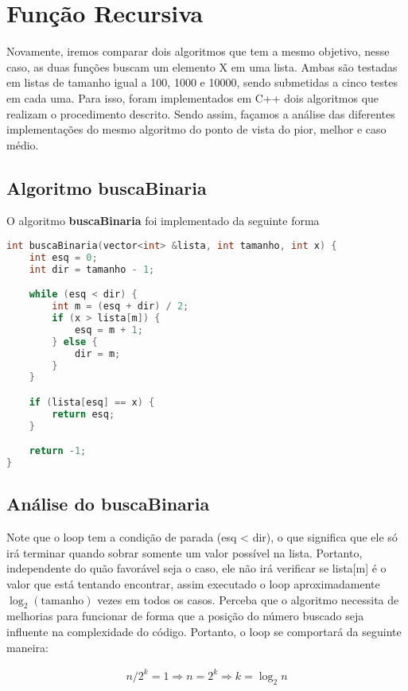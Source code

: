 \section{Função Recursiva}
\label{sec:func-rec}

Novamente, iremos comparar dois algoritmos que tem a mesmo objetivo, nesse caso, as duas funções buscam um elemento X em uma lista. Ambas são testadas em listas de tamanho igual a 100, 1000 e 10000, sendo submetidas a cinco testes em cada uma. Para isso, foram implementados em C++ dois algoritmos que realizam o procedimento descrito. Sendo assim, façamos a análise das diferentes implementações do mesmo algoritmo do ponto de vista do pior, melhor e caso médio.

\subsection{Algoritmo buscaBinaria}

O algoritmo \textbf{buscaBinaria} foi implementado da seguinte forma

\begin{lstlisting}[language=C++]
int buscaBinaria(vector<int> &lista, int tamanho, int x) {
    int esq = 0; 
    int dir = tamanho - 1;

    while (esq < dir) {
        int m = (esq + dir) / 2; 
        if (x > lista[m]) {
            esq = m + 1;
        } else {
            dir = m;
        }
    }

    if (lista[esq] == x) {
        return esq; 
    }

    return -1;
}
\end{lstlisting}

\subsection{Análise do buscaBinaria}

Note que o loop tem a condição de parada (esq < dir), o que significa que ele só irá terminar quando sobrar somente um valor possível na lista. Portanto, independente do quão favorável seja o caso, ele não irá verificar se lista[m] é o valor que está tentando encontrar, assim executado o loop aproximadamente $\log_ 2(\text{tamanho})$ vezes em todos os casos. Perceba que o algoritmo necessita de melhorias para funcionar de forma que a posição do número buscado seja influente na complexidade do código. Portanto, o loop se comportará da seguinte maneira:

\begin{align*}
        n/2^k = 1 
       \Longrightarrow n = 2^k
       \Longrightarrow k = \log_2 n
\end{align*}


